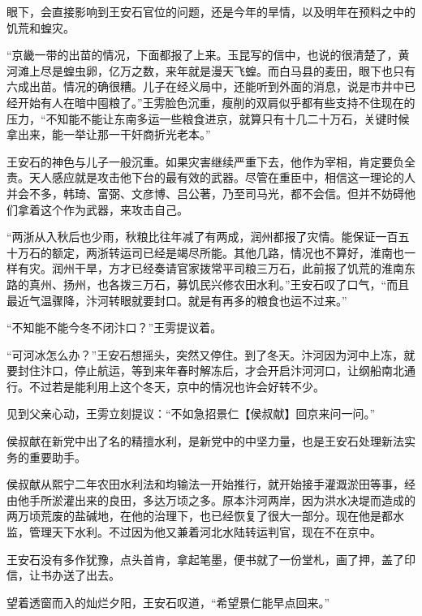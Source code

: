 眼下，会直接影响到王安石官位的问题，还是今年的旱情，以及明年在预料之中的饥荒和蝗灾。

“京畿一带的出苗的情况，下面都报了上来。玉昆写的信中，也说的很清楚了，黄河滩上尽是蝗虫卵，亿万之数，来年就是漫天飞蝗。而白马县的麦田，眼下也只有六成出苗。情况的确很糟。儿子在经义局中，还能听到外面的消息，说是市井中已经开始有人在暗中囤粮了。”王雱脸色沉重，瘦削的双肩似乎都有些支持不住现在的压力，“不知能不能让东南多运一些粮食进京，就算只有十几二十万石，关键时候拿出来，能一举让那一干奸商折光老本。”

王安石的神色与儿子一般沉重。如果灾害继续严重下去，他作为宰相，肯定要负全责。天人感应就是攻击他下台的最有效的武器。尽管在重臣中，相信这一理论的人并会不多，韩琦、富弼、文彦博、吕公著，乃至司马光，都不会信。但并不妨碍他们拿着这个作为武器，来攻击自己。

“两浙从入秋后也少雨，秋粮比往年减了有两成，润州都报了灾情。能保证一百五十万石的额定，两浙转运司已经是竭尽所能。其他几路，情况也不算好，淮南也一样有灾。润州干旱，方才已经奏请官家拨常平司粮三万石，此前报了饥荒的淮南东路的真州、扬州，也各拨三万石，募饥民兴修农田水利。”王安石叹了口气，“而且最近气温骤降，汴河转眼就要封口。就是有再多的粮食也运不过来。”

“不知能不能今冬不闭汴口？”王雱提议着。

“可河冰怎么办？”王安石想摇头，突然又停住。到了冬天。汴河因为河中上冻，就要封住汴口，停止航运，等到来年春时解冻后，才会开启汴河河口，让纲船南北通行。不过若是能利用上这个冬天，京中的情况也许会好转不少。

见到父亲心动，王雱立刻提议：“不如急招景仁【侯叔献】回京来问一问。”

侯叔献在新党中出了名的精擅水利，是新党中的中坚力量，也是王安石处理新法实务的重要助手。

侯叔献从熙宁二年农田水利法和均输法一开始推行，就开始接手灌溉淤田等事，经由他手所淤灌出来的良田，多达万顷之多。原本汴河两岸，因为洪水决堤而造成的两万顷荒废的盐碱地，在他的治理下，也已经恢复了很大一部分。现在他是都水监，管理天下水利。不过因为他又兼着河北水陆转运判官，现在不在京中。

王安石没有多作犹豫，点头首肯，拿起笔墨，便书就了一份堂札，画了押，盖了印信，让书办送了出去。

望着透窗而入的灿烂夕阳，王安石叹道，“希望景仁能早点回来。”

